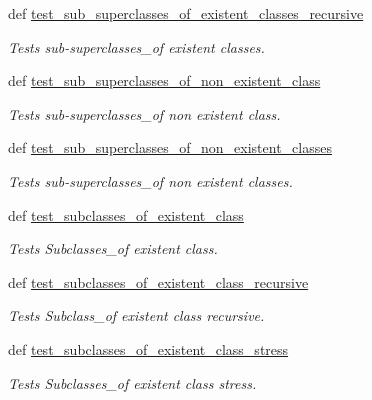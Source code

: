 \begin{DoxyCompactItemize}
def \hyperlink{classsub__super__class__functional__tests_1_1OntologyFunc_af184e6197eda380b2a70b99a2c7c2ede}{test\-\_\-sub\-\_\-superclasses\-\_\-of\-\_\-existent\-\_\-classes\-\_\-recursive}
\begin{DoxyCompactList}\small\item\em Tests sub-\/superclasses\-\_\-of existent classes. \end{DoxyCompactList}\item 
def \hyperlink{classsub__super__class__functional__tests_1_1OntologyFunc_adcc95b36fa9ee18896222f0bba6a7ec5}{test\-\_\-sub\-\_\-superclasses\-\_\-of\-\_\-non\-\_\-existent\-\_\-class}
\begin{DoxyCompactList}\small\item\em Tests sub-\/superclasses\-\_\-of non existent class. \end{DoxyCompactList}\item 
def \hyperlink{classsub__super__class__functional__tests_1_1OntologyFunc_ab7d45b5ec943915948005acc7d18facb}{test\-\_\-sub\-\_\-superclasses\-\_\-of\-\_\-non\-\_\-existent\-\_\-classes}
\begin{DoxyCompactList}\small\item\em Tests sub-\/superclasses\-\_\-of non existent classes. \end{DoxyCompactList}\item 
def \hyperlink{classsub__super__class__functional__tests_1_1OntologyFunc_ad293d2fb4c06fedde01c399221e8ee7d}{test\-\_\-subclasses\-\_\-of\-\_\-existent\-\_\-class}
\begin{DoxyCompactList}\small\item\em Tests Subclasses\-\_\-of existent class. \end{DoxyCompactList}\item 
def \hyperlink{classsub__super__class__functional__tests_1_1OntologyFunc_a992839ead105129dfb2cf2a4c95e7ef4}{test\-\_\-subclasses\-\_\-of\-\_\-existent\-\_\-class\-\_\-recursive}
\begin{DoxyCompactList}\small\item\em Tests Subclass\-\_\-of existent class recursive. \end{DoxyCompactList}\item 
def \hyperlink{classsub__super__class__functional__tests_1_1OntologyFunc_a972076ae8d5ad63906f97278e4eb0f8f}{test\-\_\-subclasses\-\_\-of\-\_\-existent\-\_\-class\-\_\-stress}
\begin{DoxyCompactList}\small\item\em Tests Subclasses\-\_\-of existent class stress. \end{DoxyCompactList}\item 

\end{DoxyCompactItemize}
